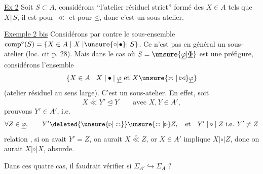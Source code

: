 \uline{Ex 2} Soit $S\subset A$, considérons ``l'atelier résiduel strict'' formé des $X\in A$ tels que $X\mathrel{\Vert}S$, il est   pour $\ll$ et  pour $\unlhd$, donc c'est un sous-atelier.

\uline{Exemple 2 bis} Considérons par contre le sous-ensemble $\operatorname{comp}^{\circ}(S)=\{X\in A\mid X\mathrel{|\unsure{\circ|\bullet}|}S\}$. Ce n'est pas en général un sous-atelier (loc. cit p. 28). Mais dans le cas où $S=\unsure{\underline{\varphi}|\underline{\Phi}}$ est une préfigure, considérons l'ensemble 
\[
\{X\in A\mid X\mathrel{|\bullet|}\underline{\varphi}\ \text{et}\ X\unsure{\asymp|\bowtie}\underline{\varphi}\}
\]
(atelier résiduel au sens large). C'est un sous-atelier. En effet, soit
\[
X\overset{\circ}{\ll}Y'\unlhd Y\qquad\text{avec }X,Y\in A',
\]
prouvons $Y'\in A'$, i.e.
\[
\forall Z\in\underline{\varphi},\qquad Y'\deleted{\unsure{\triangleright|\asymp}}\unsure{\asymp|\triangleright}Z,\quad\text{et}\quad Y'\mathrel{|\circ|}Z\ \text{i.e. }Y'\ne Z
\]
 relation ,  si on avait $Y'=Z$, on aurait $X\overset{\circ}{\ll}Z$, or $X\in A'$ implique $X\mathrel{|\circ|}Z$, donc on aurait $X\mathrel{|\circ|}X$, absurde.

\margin{$\Vert$}
Dans ces quatre cas, il faudrait vérifier si $\Sigma_{A'}\hookrightarrow\Sigma_A$ ?

